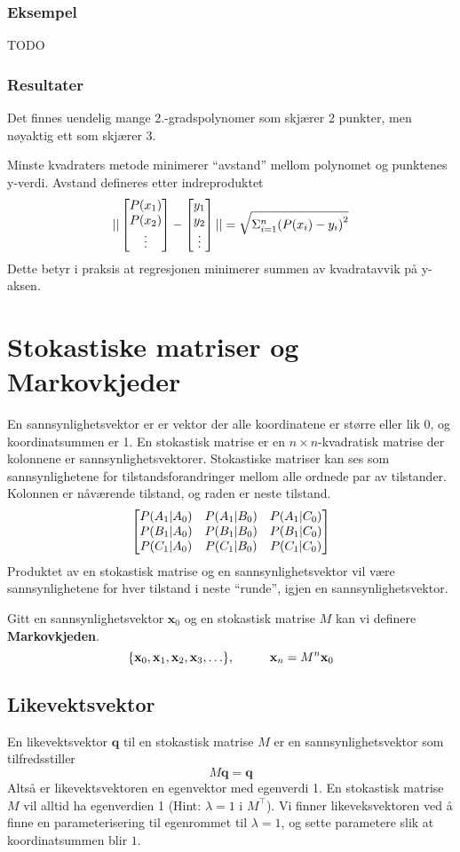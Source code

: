 \documentclass[12pt,a4paper,norsk]{article}
\makeatletter
\renewcommand{\P}{\mathbb{P}}
\newcommand{\mat}[2]{\left[\begin{array}{@{}#1@{}}#2\end{array}\right]}
\newcommand{\vx}{\textbf{x}}
\newcommand{\vq}{\textbf{q}}
\makeatother
\begin{document}
\subsubsection{Eksempel}
TODO

\subsubsection{Resultater}
Det finnes uendelig mange 2.-gradspolynomer som skjærer 2 punkter, men
nøyaktig ett som skjærer 3.

Minste kvadraters metode minimerer ``avstand'' mellom polynomet og punktenes y-verdi.
Avstand defineres etter indreproduktet
\[||\mat{c}{P(x_{1})\\P(x_{2})\\\vdots} - \mat{c}{y_{1}\\y_{2}\\\vdots}|| =
  \sqrt{\Sigma_{i=1}^{n} {(P(x_{i})-y_{i})}^{2}}\]
Dette betyr i praksis at regresjonen minimerer summen av kvadratavvik på y-aksen.

\section{Stokastiske matriser og Markovkjeder}
En sannsynlighetsvektor er er vektor der alle koordinatene er større eller lik
0, og koordinatsummen er 1. En stokastisk matrise er en $n \times n$-kvadratisk
matrise der kolonnene er sannsynlighetsvektorer. Stokastiske matriser kan ses
som sannsynlighetene for tilstandsforandringer mellom alle ordnede par av
tilstander. Kolonnen er nåværende tilstand, og raden er neste tilstand.
\[
  \mat{ccc}{
    P(A_{1} | A_{0}) & P(A_{1} | B_{0}) & P(A_{1} | C_{0}) \\
    P(B_{1} | A_{0}) & P(B_{1} | B_{0}) & P(B_{1} | C_{0}) \\
    P(C_{1} | A_{0}) & P(C_{1} | B_{0}) & P(C_{1} | C_{0}) \\
  }
\]
Produktet av en stokastisk matrise og en sannsynlighetsvektor vil
være sannsynlighetene for hver tilstand i neste ``runde'', igjen en
sannsynlighetsvektor.

Gitt en sannsynlighetsvektor $\textbf{x}_{0}$ og en stokastisk matrise $M$ kan
vi definere \textbf{Markovkjeden}.
\[\{\vx_{0}, \vx_{1}, \vx_{2}, \vx_{3}, \ldots\}, \hspace{10mm} \vx_{n} = M^{n}\vx_{0}\]

\subsection{Likevektsvektor}
En likevektsvektor $\vq$ til en stokastisk matrise $M$ er en
sannsynlighetsvektor som tilfredsstiller
\[M\vq = \vq\]
Altså er likevektsvektoren en egenvektor med egenverdi 1. En stokastisk matrise $M$
vil alltid ha egenverdien 1 (Hint: $\lambda=1$ i $M^{\top}$). Vi finner likeveksvektoren ved å finne en
parameterisering til egenrommet til $\lambda=1$, og sette parametere slik at
koordinatsummen blir $1$.
\end{document}
